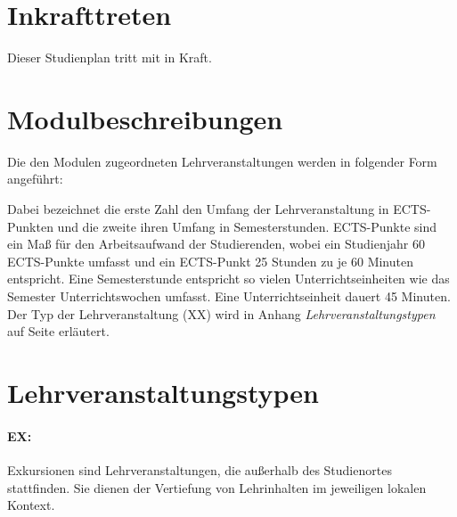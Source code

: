 %

\section{Inkrafttreten}\label{sec:IK}

Dieser Studienplan tritt mit  in Kraft.

%

\appendix
\section{Modulbeschreibungen}\label{app:AMB}

Die den Modulen zugeordneten Lehrveranstaltungen werden in folgender
Form angeführt:

\noindent
Dabei bezeichnet die erste Zahl den Umfang der
Lehrveranstaltung in ECTS-Punkten und die zweite ihren Umfang in
Semesterstunden. ECTS-Punkte sind ein Maß für den Arbeitsaufwand der
Studierenden, wobei ein Studienjahr 60 ECTS-Punkte umfasst und ein
ECTS-Punkt 25 Stunden zu je 60 Minuten entspricht. Eine Semesterstunde 
entspricht so vielen Unterrichtseinheiten wie das Semester 
Unterrichtswochen umfasst. Eine Unterrichtseinheit dauert 45 Minuten. 
Der Typ der Lehrveranstaltung (XX) wird in Anhang \emph{Lehrveranstaltungstypen}
auf Seite \pageref{app:ALT} erläutert.

%

\section{Lehrveranstaltungstypen}\label{app:ALT}

\paragraph{EX:} Exkursionen sind Lehrveranstaltungen, die außerhalb
des Studienortes stattfinden. Sie dienen der Vertiefung von
Lehrinhalten im jeweiligen lokalen Kontext.

